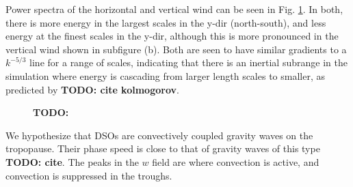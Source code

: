 \documentclass[11pt,a4paper]{article}
\newcommand\todo[1]{\textbf{TODO: #1}}
\begin{document}
Power spectra of the horizontal and vertical wind can be seen in Fig. \ref{fig:power_spectra}. In both, there is more energy in the largest scales in the y-dir (north-south), and less energy at the finest scales in the y-dir, although this is more pronounced in the vertical wind shown in subfigure (b). Both are seen to have similar gradients to a $k^{-5/3}$ line for a range of scales, indicating that there is an inertial subrange in the simulation where energy is cascading from larger length scales to smaller, as predicted by \todo{cite kolmogorov}.

\begin{figure}[htb!]%
    \centering
    \qquad
    \caption{\todo{}}%
    \label{fig:power_spectra}%
\end{figure}

We hypothesize that DSOs are convectively coupled gravity waves on the tropopause. Their phase speed is close to that of gravity waves of this type \todo{cite}. The peaks in the $w$ field are where convection is active, and convection is suppressed in the troughs. 
\end{document}

